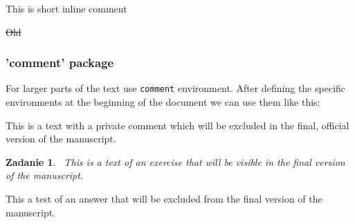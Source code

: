 \documentclass[11pt]{article}
\newcommand{\MBp}[1]{{\leavevmode\color{red!75}#1}}
\newcommand{\MBe}[2]{{\leavevmode\color{red!75}{#1}}{{\leavevmode\color{red!50}\st{#2}}}}
\newtheorem{exercise}{Zadanie }
\begin{document}
\MBp{This is short inline comment}

\MBe{New}{Old}

\subsubsection{'comment' package}
For larger parts of the text use \verb|comment| environment. After defining the specific environments at the beginning of the document we can use them like this:

\vspace{0.5cm}

\begin{private-comment}
This is a text with a private comment which will be excluded in the final, official version of the manuscript.
\end{private-comment}

\vspace{0.5cm}

\begin{exercise}\
This is a text of an exercise that will be visible in the final version of the manuscript.

\end{exercise}

\begin{answers}
This a test of an answer that will be excluded from the final version of the manuscript.
\end{answers}
\end{document}
